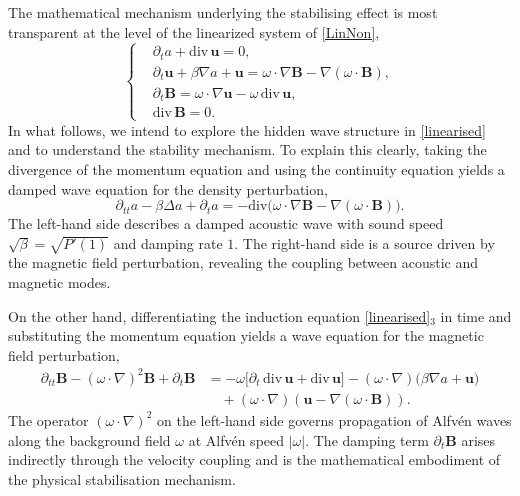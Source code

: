 \documentclass[12pt, reqno]{amsart}
\numberwithin{equation}{section}
\numberwithin{equation}{section}
\numberwithin{equation}{section}
\numberwithin{equation}{section}
\theoremstyle{remark}
\def\b{ \mathbf{B} }
\begin{document}
\medskip
The mathematical mechanism underlying the stabilising effect is most
transparent at the level of the linearized system of \eqref{LinNon},
\begin{equation}\label{linearised}
	\left\{
	\begin{aligned}
		&\partial_t a + \mathrm{div}\,\mathbf{u} = 0, \\[3pt]
		&\partial_t\mathbf{u} + \beta\nabla a + \mathbf{u}
		= \omega\cdot\nabla\b - \nabla(\omega\cdot\b), \\[3pt]
		&\partial_t\b
		= \omega\cdot\nabla\mathbf{u} - \omega\,\mathrm{div}\,\mathbf{u}, \\[3pt]
		&\mathrm{div}\,\b = 0.
	\end{aligned}
	\right.
\end{equation}
In what follows, we intend  to explore the hidden wave structure  in \eqref{linearised} and to understand the
stability mechanism. To explain this clearly, taking the divergence of the momentum equation and using the continuity
equation yields a damped wave equation for the density perturbation,
\begin{equation}\label{wave-density}
	\partial_{tt} a - \beta\Delta a + \partial_t a
	=- \mathrm{div}\bigl(\omega\cdot\nabla\b - \nabla(\omega\cdot\b)\bigr).
\end{equation}
The left-hand side describes a damped acoustic wave with
sound speed $\sqrt{\beta}=\sqrt{P'(1)}$ and damping rate $1$.  The
right-hand side is a source driven by the magnetic field perturbation,
revealing the coupling between acoustic and magnetic modes.

\medskip
On the other hand, differentiating the induction equation \eqref{linearised}$_3$ in time
and substituting the momentum equation yields a wave equation for
	the magnetic field perturbation,
\begin{equation}\label{wave-magnetic}\begin{split}
	\partial_{tt}\b - (\omega\cdot\nabla)^2\b
	+ \partial_t\b
	&= -\omega\bigl[\partial_t\,\mathrm{div}\,\mathbf{u}+\mathrm{div}\,\mathbf{u}\bigr]
	- (\omega\cdot\nabla)\bigl(\beta\nabla a + \mathbf{u}\bigr)
	\\
&\quad+ (\omega\cdot\nabla)(\mathbf{u} - \nabla(\omega\cdot\b)).
\end{split}\end{equation}
The operator $(\omega\cdot\nabla)^2$ on the left-hand side governs
propagation of Alfv\'en waves along the background field $\omega$
at Alfv\'{e}n speed $|\omega|$.  The damping term $\partial_t\b$
arises indirectly through the velocity coupling and is the mathematical
embodiment of the physical stabilisation mechanism.
\end{document}
